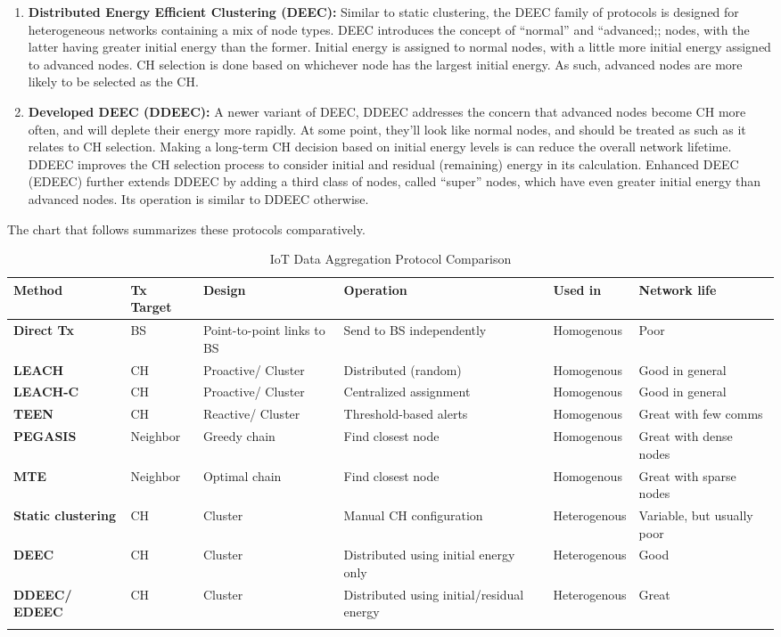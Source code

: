 \begin{enumerate}
  \item \textbf{Distributed Energy Efficient Clustering (DEEC):} Similar to
  static clustering, the DEEC family of protocols is designed for
  heterogeneous networks containing a mix of node types. DEEC introduces the
  concept of ``normal'' and ``advanced;; nodes, with the latter having greater
  initial energy than the former. Initial energy is assigned to normal nodes,
  with a little more initial energy assigned to advanced nodes. CH selection
  is done based on whichever node has the largest initial energy. As such,
  advanced nodes are more likely to be selected as the CH\@.
  \item \textbf{Developed DEEC (DDEEC):} A newer variant of DEEC, DDEEC
  addresses the concern that advanced nodes become CH more often, and will
  deplete their energy more rapidly. At some point, they'll look like normal
  nodes, and should be treated as such as it relates to CH selection. Making a
  long-term CH decision based on initial energy levels is can reduce the
  overall network lifetime. DDEEC improves the CH selection process to
  consider initial and residual (remaining) energy in its calculation.
  Enhanced DEEC (EDEEC) further extends DDEEC by adding a third class of
  nodes, called ``super'' nodes, which have even greater initial energy than
  advanced nodes. Its operation is similar to DDEEC otherwise.
\end{enumerate}

The chart that follows summarizes these protocols comparatively. 

\begin{longtable}{KKKLKL}
\toprule
\textbf{Method}
&
\textbf{Tx Target}
&
\textbf{Design}
&
\textbf{Operation}
&
\textbf{Used in}
&
\textbf{Network life}
\\ \midrule
\textbf{Direct Tx}
&
BS
&
Point-to-point links to BS
&
Send to BS independently
&
Homogenous
&
Poor
\\ \midrule
\textbf{LEACH}
&
CH
&
Proactive/ Cluster
&
Distributed (random)
&
Homogenous
&
Good in general
\\ \midrule
\textbf{LEACH-C}
&
CH
&
Proactive/ Cluster
&
Centralized assignment
&
Homogenous
&
Good in general
\\ \midrule
\textbf{TEEN}
&
CH
&
Reactive/ Cluster
&
Threshold-based alerts
&
Homogenous
&
Great with few comms
\\ \midrule
\textbf{PEGASIS}
&
Neighbor
&
Greedy chain
&
Find closest node
&
Homogenous
&
Great with dense nodes
\\ \midrule
\textbf{MTE}
&
Neighbor
&
Optimal chain
&
Find closest node
&
Homogenous
&
Great with sparse nodes
\\ \midrule
\textbf{Static clustering}
&
CH
&
Cluster
&
Manual CH configuration
&
Heterogenous
&
Variable, but usually poor
\\ \midrule
\textbf{DEEC}
&
CH
&
Cluster
&
Distributed using initial energy only
&
Heterogenous
&
Good
\\ \midrule
\textbf{DDEEC/ EDEEC}
&
CH
&
Cluster
&
Distributed using initial/residual energy
&
Heterogenous
&
Great
\\
\bottomrule
\caption{IoT Data Aggregation Protocol Comparison}
\end{longtable}


